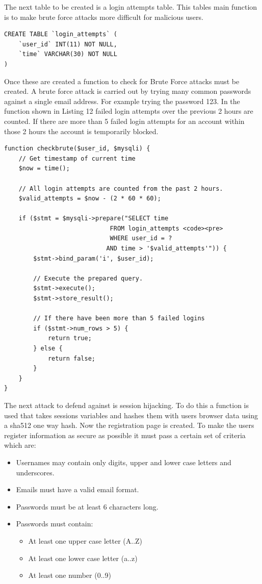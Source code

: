 \documentclass[a4paper, 12pt]{report}
\begin{document}
The next table to be created is a login attempts table. This tables main function is to make brute force attacks more difficult for malicious users. 
\begin{lstlisting}[caption=Code to create login attempts table]
CREATE TABLE `login_attempts` (
    `user_id` INT(11) NOT NULL,
    `time` VARCHAR(30) NOT NULL
)
\end{lstlisting}

Once these are created a function to check for Brute Force attacks must be created. A brute force attack is carried out by trying many common passwords against a single email address. For example trying the password 123. In the function shown in Listing 12 failed login attempts over the previous 2 hours are counted. If there are more than 5 failed login attempts for an account within those 2 hours the account is temporarily blocked.
\begin{lstlisting}[caption=Brute Force prevention function]
function checkbrute($user_id, $mysqli) {
    // Get timestamp of current time 
    $now = time();
 
    // All login attempts are counted from the past 2 hours. 
    $valid_attempts = $now - (2 * 60 * 60);
 
    if ($stmt = $mysqli->prepare("SELECT time 
                             FROM login_attempts <code><pre>
                             WHERE user_id = ? 
                            AND time > '$valid_attempts'")) {
        $stmt->bind_param('i', $user_id);
 
        // Execute the prepared query. 
        $stmt->execute();
        $stmt->store_result();
 
        // If there have been more than 5 failed logins 
        if ($stmt->num_rows > 5) {
            return true;
        } else {
            return false;
        }
    }
}
\end{lstlisting}
The next attack to defend against is session hijacking. To do this a function is used that takes sessions variables and hashes them with users browser data using a sha512 one way hash. 
Now the registration page is created. To make the users register information as secure as possible it must pass a certain set of criteria which are:
\begin{itemize}
\item Usernames may contain only digits, upper and lower case letters and underscores.
\item Emails must have a valid email format.
\item Passwords must be at least 6 characters long.
\item Passwords must contain:
\begin{itemize}
\item At least one upper case letter (A..Z)
\item At least one lower case letter (a..z)
\item At least one number (0..9)
\end{itemize}
\end{itemize}
\end{document}
